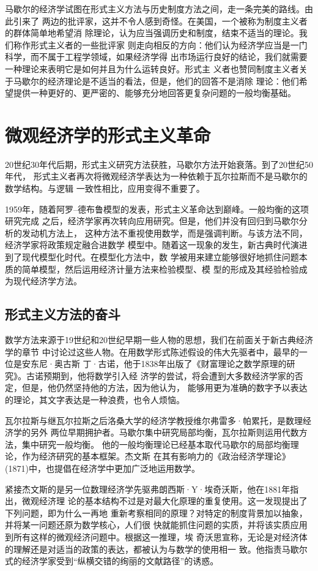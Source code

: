 马歇尔的经济学试图在形式主义方法与历史制度方法之间，走一条完美的路线。由此引来了
两边的批评家，这并不令人感到奇怪。在美国，一个被称为制度主义者的群体简单地希望消
除理论，认为应当强调历史和制度，结束不适当的理论。我们称作形式主义者的一些批评家
则走向相反的方向：他们认为经济学应当是一门科学，而不属于工程学领域，如果经济学得
出市场运行良好的结论，我们就需要一种理论来表明它是如何并且为什么运转良好。形式主
义者也赞同制度主义者关于马歇尔的经济理论是不适当的看法，但是，他们的回答不是消除
理论：他们希望提供一种更好的、更严密的、能够充分地回答更复杂问题的一般均衡基础。


\section{微观经济学的形式主义革命}

20世纪30年代后期，形式主义研究方法获胜，马歇尔方法开始衰落。到了20世纪50年代，
形式主义者再次将微观经济学表达为一种依赖于瓦尔拉斯而不是马歇尔的数学结构。与逻辑
一致性相比，应用变得不重要了。

1959年，随着阿罗--德布鲁模型的发表，形式主义革命达到巅峰。一般均衡的这项研究完成
之后，经济学家再次转向应用研究。但是，他们并没有回归到马歇尔分析的发动机方法上，
这种方法不重视使用数学，而是强调判断。与该方法不同，经济学家将政策规定融合进数学
模型中。随着这一现象的发生，新古典时代演进到了现代模型化时代。在模型化方法中，数
学被用来建立能够很好地抓住问题本质的简单模型，然后运用经济计量方法来检验模型、模
型的形成及其经验检验成为现代经济学方法。

\subsection{形式主义方法的奋斗}

数学方法来源于19世纪和20世纪早期一些人物的思想，我们在前面关于新古典经济学的章节
中讨论过这些人物。在用数学形式陈述假设的伟大先驱者中，最早的一位是安东尼·奥古斯
丁·古诺，他于1838年出版了《财富理论之数学原理的研究》。古诺预期到，他将数学引入经
济学的尝试，将会遭到大多数经济学家的否定，但是，他仍然坚持他的方法，因为他认为，
能够用更为准确的数字予以表达的理论，其文字表达是一种浪费，也令人烦恼。

瓦尔拉斯与继瓦尔拉斯之后洛桑大学的经济学教授维尔弗雷多·帕累托，是数理经济学的另外
两位早期拥护者。马歇尔集中研究局部均衡，瓦尔拉斯则运用代数方法，集中研究一般均衡。
他的一般均衡理论已经基本取代马歇尔的局部均衡理论，作为经济研究的基本框架。杰文斯
在其有影响力的《政治经济学理论》(1871)中，也提倡在经济学中更加广泛地运用数学。

紧接杰文斯的是另一位数理经济学先驱弗朗西斯·Y·埃奇沃斯，他在1881年指出，微观经济理
论的基本结构不过是对最大化原理的重复使用。这一发现提出了下列问题，即为什么一再地
重新考察相同的原理？对特定的制度背景加以抽象，并将某一问题还原为数学核心，人们很
快就能抓住问题的实质，并将该实质应用到所有这样的微观经济问题中。根据这一推理，埃
奇沃思宣称，无论是对经济体的理解还是对适当的政策的表达，都被认为与数学的使用相一
致。他指责马歇尔式的经济学家受到“纵横交错的绚丽的文献路径”的诱惑。

